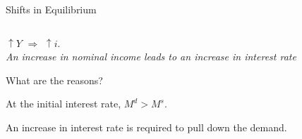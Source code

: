 \documentclass[shownotes,11pt, aspectratio=169]{beamer}
\newenvironment{wideitemize}{\itemize\addtolength{\itemsep}{10pt}}{\enditemize}
\begin{document}
\begin{frame}{Shifts in Equilibrium}
\begin{columns}[T] %
\begin{column}{.52\textwidth}
  \begin{wideitemize}
    \item $\uparrow Y$ \pause $\Rightarrow$ $\uparrow i$. \\
      \textit{An increase in nominal income leads to an increase in interest rate}
    \item What are the reasons? \pause
    \item At the initial interest rate, $M^d > M^s$. 
    \item An increase in interest rate is required to pull down the demand. 
  \end{wideitemize}
\end{column}%
\pause
\hfill%
\begin{column}{.44\textwidth}
\end{column}%
\end{columns}
\end{frame}
\end{document}
